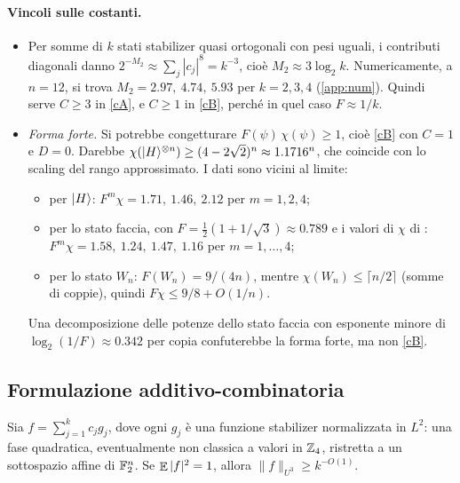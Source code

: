 \paragraph{Vincoli sulle costanti.}
\begin{itemize}[leftmargin=1.5em]
\item Per somme di $k$ stati stabilizer quasi ortogonali con pesi uguali, i contributi diagonali danno $2^{-M_2}\approx\sum_j|c_j|^8=k^{-3}$, cioè $M_2\approx3\log_2k$. Numericamente, a $n=12$, si trova $M_2=2.97,\ 4.74,\ 5.93$ per $k=2,3,4$ (\cref{app:num}). Quindi serve $C\ge3$ in \ref{cA}, e $C\ge1$ in \ref{cB}, perché in quel caso $F\approx1/k$.
\item \emph{Forma forte.} Si potrebbe congetturare $F(\psi)\,\chi(\psi)\ge1$, cioè \ref{cB} con $C=1$ e $D=0$. Darebbe $\chi(\lvert H\rangle^{\otimes n})\ge(4-2\sqrt2)^n\approx1.1716^n$, che coincide con lo scaling del rango approssimato. I dati sono vicini al limite:
\begin{itemize}
\item per $\lvert H\rangle$: $F^m\chi=1.71,\ 1.46,\ 2.12$ per $m=1,2,4$;
\item per lo stato faccia, con $F=\tfrac12(1+1/\sqrt3)\approx0.789$ e i valori di $\chi$ di \cite{LR26}: $F^m\chi=1.58,\ 1.24,\ 1.47,\ 1.16$ per $m=1,\dots,4$;
\item per lo stato $W_n$: $F(W_n)=9/(4n)$, mentre $\chi(W_n)\le\lceil n/2\rceil$ (somme di coppie), quindi $F\chi\le9/8+O(1/n)$.
\end{itemize}
Una decomposizione delle potenze dello stato faccia con esponente minore di $\log_2(1/F)\approx0.342$ per copia confuterebbe la forma forte, ma non \ref{cB}.
\end{itemize}

\subsection{Formulazione additivo-combinatoria}

\begin{conjecture}\label{conj:gowers}
Sia $f=\sum_{j=1}^kc_jg_j$, dove ogni $g_j$ è una funzione stabilizer normalizzata in $L^2$: una fase quadratica, eventualmente non classica a valori in $\mathbb Z_4$, ristretta a un sottospazio affine di $\mathbb F_2^n$. Se $\mathop{\mathbb E}|f|^2=1$, allora $\|f\|_{U^3}\ge k^{-O(1)}$.
\end{conjecture}

